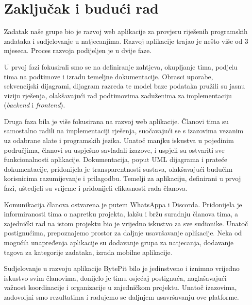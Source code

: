 \chapter{Zaključak i budući rad}
		
\noindent Zadatak naše grupe bio je razvoj web aplikacije za provjeru riješenih programskih zadataka i
sudjelovanje u natjecanjima. Razvoj aplikacije trajao je nešto više od 3 mjeseca. Proces razvoja podijeljen je u dvije faze.

		U prvoj fazi fokusirali smo se na definiranje zahtjeva, okupljanje tima, podjelu tima na podtimove i izradu temeljne dokumentacije. Obrasci uporabe, sekvencijski dijagrami, dijagram razreda te model baze podataka pružili su jasnu viziju rješenja, olakšavajući rad podtimovima zaduženima za implementaciju (\textit{backend} i \textit{frontend}). 
		
		Druga faza bila je više fokusirana na razvoj web aplikacije. Članovi tima su samostalno radili na implementaciji rješenja, suočavajući se s izazovima vezanim uz odabrane alate i programskih jezika. Unatoč manjku iskustva u pojedinim područjima, članovi su uspješno savladali izazove, i uspjeli su ostvariti sve funkcionalnosti aplikacije. Dokumentacija, poput UML dijagrama i prateće dokumentacije, pridonijela je transparentnosti sustava, olakšavajući budućim korisnicima razumijevanje i prilagodbu. Temelji za aplikaciju, definirani u prvoj fazi, uštedjeli su vrijeme i pridonijeli efikasnosti rada članova.
		
		Komunikacija članova ostvarena je putem WhatsAppa i Discorda. Pridonijela je informiranosti tima o napretku projekta, lakšu i bržu suradnju članova tima, a zajednički rad na istom projektu bio je vrijedno iskustvo za sve sudionike. Unatoč postignućima, prepoznajemo prostor za daljnje usavršavanje aplikacije. Neka od mogućih unapređenja aplikacije su dodavanje grupa za natjecanja, dodavanje tagova za kategorije zadataka, izrada mobilne aplikacije. 
		  
		Sudjelovanje u razvoju aplikacije BytePit bilo je jedinstveno i iznimno vrijedno iskustvo svim članovima, donijelo je timu osjećaj postignuća, naglašavajući važnost koordinacije i organizacije u zajedničkom projektu. Unatoč izazovima, zadovoljni smo rezultatima i radujemo se daljnjem usavršavanju ove platforme.
		\eject 